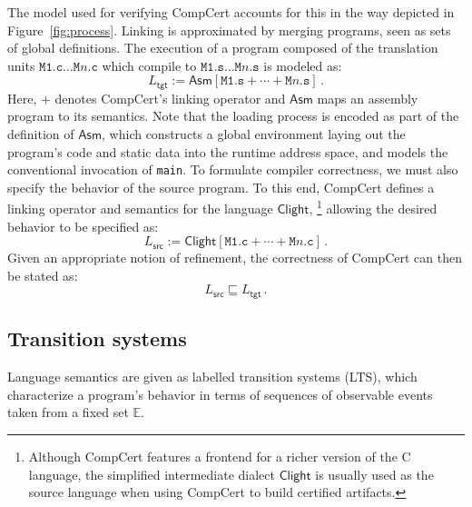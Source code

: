 \documentclass[11pt,oneside]{book}
\theoremstyle{definition}
\newcommand{\kw}[1]{\ensuremath{ \mathsf{#1} }}
\newcommand{\refby}{\sqsubseteq} %
\begin{document}
The model used for verifying CompCert accounts for this
in the way depicted in Figure~\ref{fig:process}.
Linking is approximated by
merging programs, seen as sets of global definitions.
The execution
of a program composed of the translation units
$\texttt{M1.c} \ldots \texttt{M$n$.c}$
which compile to
$\texttt{M1.s} \ldots \texttt{M$n$.s}$
is modeled as:
\[
    L_\kw{tgt} :=
    \kw{Asm}[\texttt{M1.s} +
             \cdots +
             \texttt{M$n$.s}] \,.
\]
Here,
$+$ denotes CompCert's linking operator and
$\kw{Asm}$ maps an assembly program to its semantics.
Note that the loading process is encoded
as part of the definition of $\kw{Asm}$,
which constructs a global environment
laying out the program's code and static data
into the runtime address space,
and models the conventional invocation of \texttt{main}.
To formulate compiler correctness,
we must also specify the behavior of the source program.
To this end,
CompCert defines a linking operator
and semantics
for the language $\kw{Clight}$,%
\footnote{
  Although CompCert features a frontend for a richer version
  of the C language,
  the simplified intermediate dialect \kw{Clight}
  is usually used as the source language
  when using CompCert to build certified artifacts.
}
allowing the desired behavior to be specified as:
\[
    L_\kw{src} :=
    \kw{Clight}[\texttt{M1.c} + \cdots + \texttt{M$n$.c}] \,.
\]
Given an appropriate notion of refinement,
the correctness of CompCert
can then be stated as:
\[
  L_\kw{src} \refby L_\kw{tgt}
  \,.
\]


\subsection{Transition systems} %

Language semantics are
given as labelled transition systems (LTS),
which characterize a program's behavior in terms of
sequences of observable events
taken from a fixed set $\mathbb{E}$.
\end{document}
